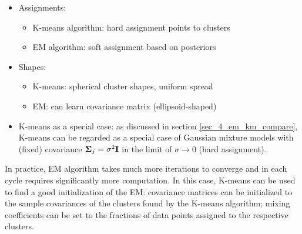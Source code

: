 \documentclass[../book-template.tex]{subfiles}
\begin{document}
\begin{itemize}
	\item Assignments:
	\begin{itemize}
		\item K-means algorithm: hard assignment points to clusters
		\item EM algorithm: soft assignment based on posteriors
	\end{itemize}
	\item Shapes:
	\begin{itemize}
		\item K-means: spherical cluster shapes, uniform spread
		\item EM: can learn covariance matrix (ellipsoid-shaped)
	\end{itemize}
	\item K-means as a special case: as discussed in section \ref{sec_4_em_km_compare}, K-means can be regarded as a special case of Gaussian mixture models with (fixed) covariance ${\bf \Sigma}_j=\sigma^2{\bf I}$ in the limit of $\sigma \rightarrow 0$ (hard assignment).
\end{itemize}
\par In practice, EM algorithm takes much more iterations to converge and in each cycle requires significantly more computation. In this case, K-means can be used to find a good initialization of the EM: covariance matrices can be initialized to the sample covariances of the clusters found by the K-means algorithm; mixing coefficients can be set to the fractions of data points assigned to the respective clusters.
\end{document}

